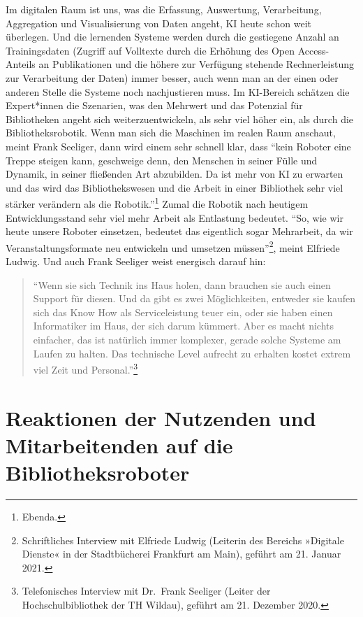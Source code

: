 \documentclass[a4paper,
fontsize=11pt,
oneside,
numbers=noperiodatend,
parskip=half-,
bibliography=totoc,
final
]{scrartcl}
\begin{document}
Im digitalen Raum ist uns, was die Erfassung, Auswertung, Verarbeitung,
Aggregation und Visualisierung von Daten angeht, KI heute schon weit
überlegen. Und die lernenden Systeme werden durch die gestiegene Anzahl
an Trainingsdaten (Zugriff auf Volltexte durch die Erhöhung des Open
Access-Anteils an Publikationen und die höhere zur Verfügung stehende
Rechnerleistung zur Verarbeitung der Daten) immer besser, auch wenn man
an der einen oder anderen Stelle die Systeme noch nachjustieren muss. Im
KI-Bereich schätzen die Expert*innen die Szenarien, was den Mehrwert und
das Potenzial für Bibliotheken angeht sich weiterzuentwickeln, als sehr
viel höher ein, als durch die Bibliotheksrobotik. Wenn man sich die
Maschinen im realen Raum anschaut, meint Frank Seeliger, dann wird einem
sehr schnell klar, dass \enquote{kein Roboter eine Treppe steigen kann,
geschweige denn, den Menschen in seiner Fülle und Dynamik, in seiner
fließenden Art abzubilden. Da ist mehr von KI zu erwarten und das wird
das Bibliothekswesen und die Arbeit in einer Bibliothek sehr viel
stärker verändern als die Robotik.}\footnote{Ebenda.} Zumal die Robotik
nach heutigem Entwicklungsstand sehr viel mehr Arbeit als Entlastung
bedeutet. \enquote{So, wie wir heute unsere Roboter einsetzen, bedeutet
das eigentlich sogar Mehrarbeit, da wir Veranstaltungsformate neu
entwickeln und umsetzen müssen}\footnote{Schriftliches Interview mit
  Elfriede Ludwig (Leiterin des Bereichs »Digitale Dienste« in der
  Stadtbücherei Frankfurt am Main), geführt am 21. Januar 2021.}, meint
Elfriede Ludwig. Und auch Frank Seeliger weist energisch darauf hin:

\begin{quote}
\enquote{Wenn sie sich Technik ins Haus holen, dann brauchen sie auch
einen Support für diesen. Und da gibt es zwei Möglichkeiten, entweder
sie kaufen sich das Know How als Serviceleistung teuer ein, oder sie
haben einen Informatiker im Haus, der sich darum kümmert. Aber es macht
nichts einfacher, das ist natürlich immer komplexer, gerade solche
Systeme am Laufen zu halten. Das technische Level aufrecht zu erhalten
kostet extrem viel Zeit und Personal.}\footnote{Telefonisches Interview
  mit Dr.~Frank Seeliger (Leiter der Hochschulbibliothek der TH Wildau),
  geführt am 21. Dezember 2020.}
\end{quote}

\hypertarget{reaktionen-der-nutzenden-und-mitarbeitenden-auf-die-bibliotheksroboter}{%
\section{Reaktionen der Nutzenden und Mitarbeitenden auf die Bibliotheksroboter}\label{reaktionen-der-nutzenden-und-mitarbeitenden-auf-die-bibliotheksroboter}}
\end{document}
